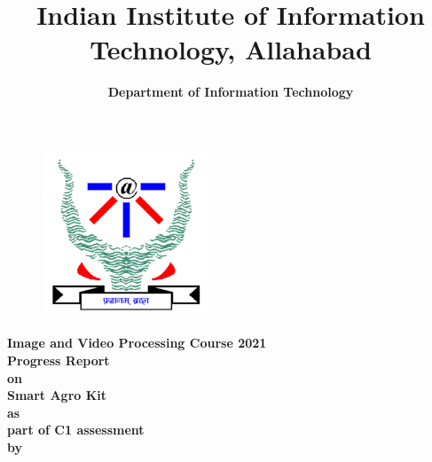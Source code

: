 \documentclass{article}
\title{\textbf{ Indian Institute of Information Technology, Allahabad 
}}
\date{\LARGE\textbf{Department of Information Technology}}
\begin{document}
\clearpage\maketitle

\thispagestyle{empty}

\begin{center} 
    \begin{figure}[h]
        \centering
        \includegraphics[width=5cm]{pics/iiitalogo.png}
        \label{fig:logo}
    \end{figure}
    \vspace{5mm}
    \textbf{Image and Video Processing Course 2021}\\ \vspace{5mm}
    \textbf{Progress Report}\\	\vspace{5mm}
     \textbf{on }\\	\vspace{5mm}
       \textbf{Smart Agro Kit }\\	\vspace{5mm}
         \textbf{as }	\\\vspace{5mm}
         \textbf{part of C1 assessment }\\	\vspace{5mm}
         \textbf{by }\\	\vspace{5mm}
        
     
     \smallskip
     


\end{center}
\end{document}
